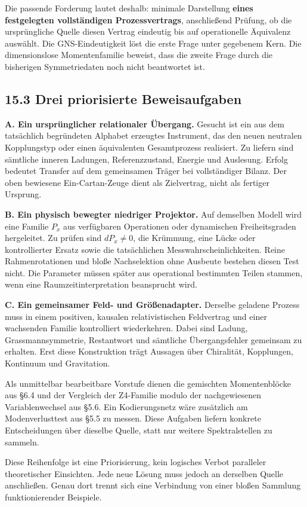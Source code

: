Die passende Forderung lautet deshalb: minimale Darstellung
\textbf{eines festgelegten vollständigen Prozessvertrags}, anschließend
Prüfung, ob die ursprüngliche Quelle diesen Vertrag eindeutig bis auf
operationelle Äquivalenz auswählt. Die GNS-Eindeutigkeit löst die erste
Frage unter gegebenem Kern. Die dimensionslose Momentenfamilie beweist,
dass die zweite Frage durch die bisherigen Symmetriedaten noch nicht
beantwortet ist.

\subsection{15.3 Drei priorisierte
Beweisaufgaben}\label{drei-priorisierte-beweisaufgaben}

\textbf{A. Ein ursprünglicher relationaler Übergang.} Gesucht ist ein
aus dem tatsächlich begründeten Alphabet erzeugtes Instrument, das den
neuen neutralen Kopplungstyp oder einen äquivalenten Gesamtprozess
realisiert. Zu liefern sind sämtliche inneren Ladungen, Referenzzustand,
Energie und Auslesung. Erfolg bedeutet Transfer auf dem gemeinsamen
Träger bei vollständiger Bilanz. Der oben bewiesene Ein-Cartan-Zeuge
dient als Zielvertrag, nicht als fertiger Ursprung.

\textbf{B. Ein physisch bewegter niedriger Projektor.} Auf demselben
Modell wird eine Familie \(P_x\) aus verfügbaren Operationen oder
dynamischen Freiheitsgraden hergeleitet. Zu prüfen sind \(dP_x\ne0\),
die Krümmung, eine Lücke oder kontrollierter Ersatz sowie die
tatsächlichen Messwahrscheinlichkeiten. Reine Rahmenrotationen und bloße
Nachselektion ohne Ausbeute bestehen diesen Test nicht. Die Parameter
müssen später aus operational bestimmten Teilen stammen, wenn eine
Raumzeitinterpretation beansprucht wird.

\textbf{C. Ein gemeinsamer Feld- und Größenadapter.} Derselbe geladene
Prozess muss in einem positiven, kausalen relativistischen Feldvertrag
und einer wachsenden Familie kontrolliert wiederkehren. Dabei sind
Ladung, Grassmannsymmetrie, Restantwort und sämtliche Übergangsfehler
gemeinsam zu erhalten. Erst diese Konstruktion trägt Aussagen über
Chiralität, Kopplungen, Kontinuum und Gravitation.

Als unmittelbar bearbeitbare Vorstufe dienen die gemischten
Momentenblöcke aus §6.4 und der Vergleich der Z4-Familie modulo der
nachgewiesenen Variablenwechsel aus §5.6. Ein Kodierungsnetz wäre
zusätzlich am Modenverlusttest aus §5.5 zu messen. Diese Aufgaben
liefern konkrete Entscheidungen über dieselbe Quelle, statt nur weitere
Spektralstellen zu sammeln.

Diese Reihenfolge ist eine Priorisierung, kein logisches Verbot
paralleler theoretischer Einsichten. Jede neue Lösung muss jedoch an
derselben Quelle anschließen. Genau dort trennt sich eine Verbindung von
einer bloßen Sammlung funktionierender Beispiele.

